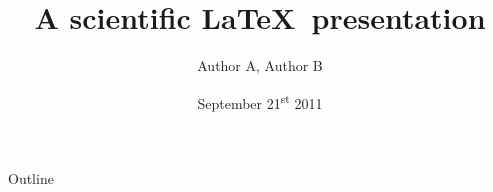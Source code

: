 \documentclass[compress]{beamer}
\title[Scientific \LaTeX~presentation]{A scientific \LaTeX~presentation}  %
\author[A, B]{Author A, Author B}  %
\date[]{September 21\textsuperscript{st} 2011} %
\begin{document}
\begin{frame} %
  \titlepage
  \thispagestyle{empty}
\end{frame}

\begin{frame}{Outline} %
  \tableofcontents
\end{frame}


\end{document}
